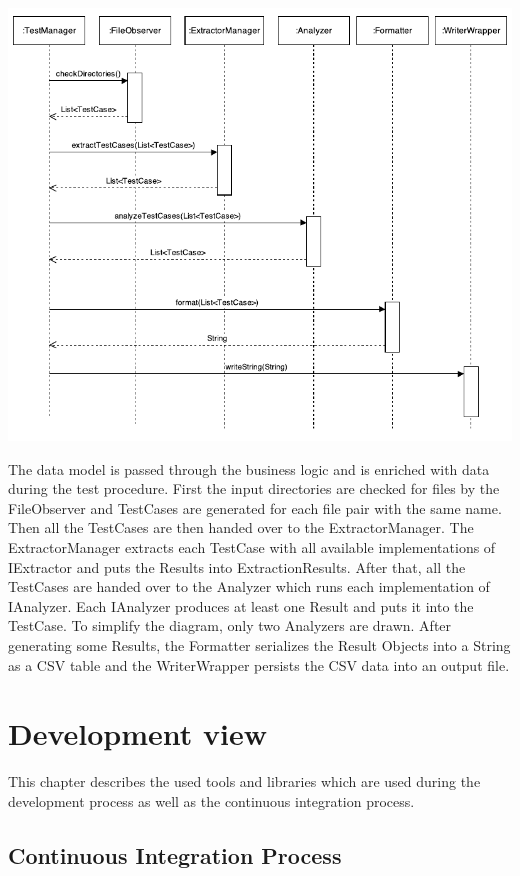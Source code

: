 \includegraphics[width=15cm]{Figures/activityDiagram.pdf}

The data model is passed through the business logic and is enriched with data during the test procedure. First the input directories are checked for files by the FileObserver and TestCases are generated for each file pair with the same name. Then all the TestCases are then handed over to the ExtractorManager. The ExtractorManager extracts each TestCase with all available implementations of IExtractor and puts the Results into ExtractionResults. After that, all the TestCases are handed over to the Analyzer which runs each implementation of IAnalyzer. Each IAnalyzer produces at least one Result and puts it into the TestCase. To simplify the diagram, only two Analyzers are drawn. After generating some Results, the Formatter serializes the Result Objects into a String as a CSV table and the WriterWrapper persists the CSV data into an output file.


\section{Development view}

This chapter describes the used tools and libraries which are used during the development process as well as the continuous integration process.


\subsection{Continuous Integration Process}

